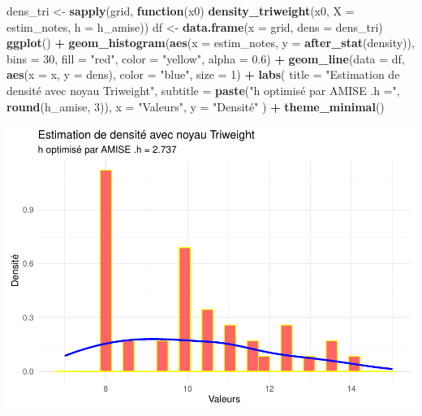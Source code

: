 \documentclass[
  12pt,
]{article}
\newenvironment{Shaded}{\begin{snugshade}}{\end{snugshade}}
\newcommand{\AttributeTok}[1]{\textcolor[rgb]{0.13,0.29,0.53}{#1}}
\newcommand{\ControlFlowTok}[1]{\textcolor[rgb]{0.13,0.29,0.53}{\textbf{#1}}}
\newcommand{\DecValTok}[1]{\textcolor[rgb]{0.00,0.00,0.81}{#1}}
\newcommand{\FloatTok}[1]{\textcolor[rgb]{0.00,0.00,0.81}{#1}}
\newcommand{\FunctionTok}[1]{\textcolor[rgb]{0.13,0.29,0.53}{\textbf{#1}}}
\newcommand{\NormalTok}[1]{#1}
\newcommand{\OtherTok}[1]{\textcolor[rgb]{0.56,0.35,0.01}{#1}}
\newcommand{\SpecialCharTok}[1]{\textcolor[rgb]{0.81,0.36,0.00}{\textbf{#1}}}
\newcommand{\StringTok}[1]{\textcolor[rgb]{0.31,0.60,0.02}{#1}}
\begin{document}
\begin{Shaded}
\begin{Highlighting}[]
\NormalTok{dens\_tri }\OtherTok{\textless{}{-}} \FunctionTok{sapply}\NormalTok{(grid, }\ControlFlowTok{function}\NormalTok{(x0) }\FunctionTok{density\_triweight}\NormalTok{(x0, }\AttributeTok{X =}\NormalTok{ estim\_notes, }\AttributeTok{h =}\NormalTok{ h\_amise))}
\NormalTok{df }\OtherTok{\textless{}{-}} \FunctionTok{data.frame}\NormalTok{(}\AttributeTok{x =}\NormalTok{ grid, }\AttributeTok{dens =}\NormalTok{ dens\_tri)}
\FunctionTok{ggplot}\NormalTok{() }\SpecialCharTok{+}
  \FunctionTok{geom\_histogram}\NormalTok{(}\FunctionTok{aes}\NormalTok{(}\AttributeTok{x =}\NormalTok{ estim\_notes, }\AttributeTok{y =} \FunctionTok{after\_stat}\NormalTok{(density)),}
                 \AttributeTok{bins =} \DecValTok{30}\NormalTok{, }\AttributeTok{fill =} \StringTok{"red"}\NormalTok{, }\AttributeTok{color =} \StringTok{"yellow"}\NormalTok{, }\AttributeTok{alpha =} \FloatTok{0.6}\NormalTok{) }\SpecialCharTok{+}
  \FunctionTok{geom\_line}\NormalTok{(}\AttributeTok{data =}\NormalTok{ df, }\FunctionTok{aes}\NormalTok{(}\AttributeTok{x =}\NormalTok{ x, }\AttributeTok{y =}\NormalTok{ dens),}
            \AttributeTok{color =} \StringTok{"blue"}\NormalTok{, }\AttributeTok{size =} \DecValTok{1}\NormalTok{) }\SpecialCharTok{+}
  \FunctionTok{labs}\NormalTok{(}
    \AttributeTok{title =} \StringTok{"Estimation de densité avec noyau Triweight"}\NormalTok{,}
    \AttributeTok{subtitle =} \FunctionTok{paste}\NormalTok{(}\StringTok{"h optimisé par AMISE .h ="}\NormalTok{, }\FunctionTok{round}\NormalTok{(h\_amise, }\DecValTok{3}\NormalTok{)),}
    \AttributeTok{x =} \StringTok{"Valeurs"}\NormalTok{, }\AttributeTok{y =} \StringTok{"Densité"}
\NormalTok{  ) }\SpecialCharTok{+}
  \FunctionTok{theme\_minimal}\NormalTok{()}
\end{Highlighting}
\end{Shaded}

\includegraphics{Stat_non_para_files/figure-latex/unnamed-chunk-166-1.pdf}
\end{document}
